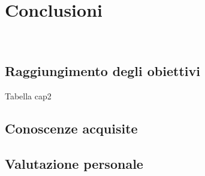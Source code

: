 
\chapter{Conclusioni}
\label{cap:conclusioni}

\\

\section{Raggiungimento degli obiettivi}
Tabella cap2\\
\cite{synclab}
\cite{corso}
\cite{statistiche}
\cite{apptonative}
\cite{dart}
\cite{dartstoria}
\cite{differenza}
\cite{flutter}
\cite{fluttermobile}
\cite{flutterdettagli}
\section{Conoscenze acquisite}

\section{Valutazione personale}
